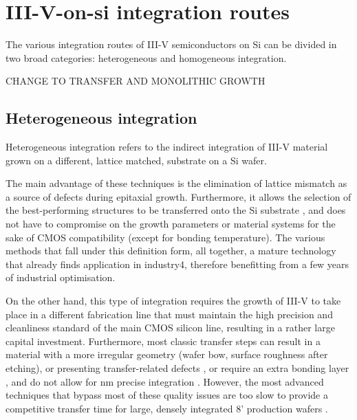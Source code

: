 \section{\texorpdfstring{III-V-on-\acs{si} integration routes}{III-V-on-Si integration routes}}
The various integration routes of III-V semiconductors on Si can be divided in two broad categories: heterogeneous and homogeneous integration.

CHANGE TO TRANSFER AND MONOLITHIC GROWTH

\subsection{Heterogeneous integration}
Heterogeneous integration refers to the indirect integration of III-V material grown on a different, lattice matched, substrate on a Si wafer. 
\par
The main advantage of these techniques is the elimination of lattice mismatch as a source of defects during epitaxial growth. Furthermore, it allows the selection of the best-performing structures to be transferred onto the Si substrate \cite{Zadeh2016, Wang2017}, and does not have to compromise on the growth parameters or material systems for the sake of CMOS compatibility (except for bonding temperature). The various methods that fall under this definition form, all together, a mature technology that already finds application in industry4, therefore benefitting from a few years of industrial optimisation.
\par
On the other hand, this type of integration requires the growth of III-V to take place in a different fabrication line that must maintain the high precision and cleanliness standard of the main CMOS silicon line, resulting in a rather large capital investment. Furthermore, most classic transfer steps can result in a material with a more irregular geometry (wafer bow, surface roughness after etching), or presenting transfer-related defects \cite{Jevtics2022}, or require an extra bonding layer \cite{Jevtics2022, Tang2019}, and do not allow for nm precise integration \cite{Wang2017, McPhillimy2020}. However, the most advanced techniques that bypass most of these quality issues are too slow to provide a competitive transfer time for large, densely integrated 8' production wafers \cite{Wang2017, McPhillimy2020}.
